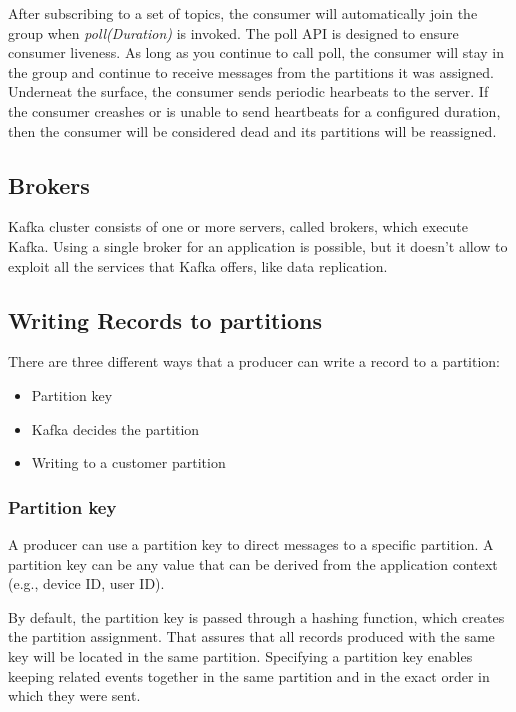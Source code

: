 After subscribing to a set of topics, the consumer will automatically join the
group when \textit{poll(Duration)} is invoked.
The poll API is designed to ensure consumer liveness. As long as you continue
to call poll, the consumer will stay in the group and continue to receive
messages from the partitions it was assigned. Underneat the surface, the
consumer sends periodic hearbeats to the server. If the consumer creashes or is
unable to send heartbeats for a configured duration, then the consumer will be
considered dead and its partitions will be reassigned.

\subsection{Brokers}

Kafka cluster consists of one or more servers, called brokers, which execute
Kafka. Using a single broker for an application is possible, but it doesn't
allow to exploit all the services that Kafka offers, like data replication.

\subsection{Writing Records to partitions}

There are three different ways that a producer can write a record to a
partition:

\begin{itemize}
    \item   Partition key
    \item   Kafka decides the partition
    \item   Writing to a customer partition
\end{itemize}

\subsubsection{Partition key}

A producer can use a partition key to direct messages to a specific partition.
A partition key can be any value that can be derived from the application
context (e.g., device ID, user ID).

By default, the partition key is passed through a hashing function, which
creates the partition assignment. That assures that all records produced with
the same key will be located in the same partition. Specifying a partition key
enables keeping related events together in the same partition and in the exact
order in which they were sent.


